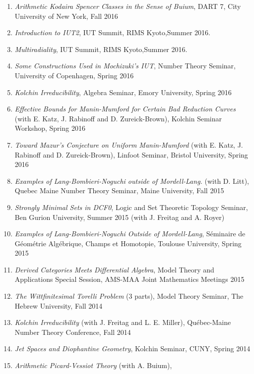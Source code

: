 \documentclass[a4paper,10pt]{article}
\begin{document}
\begin{enumerate}
	\item \emph{Arithmetic Kodaira Spencer Classes in the Sense of Buium}, DART 7, City University of New York, Fall 2016 
	\item \emph{Introduction to IUT2}, IUT Summit, RIMS Kyoto,Summer 2016.
	\item \emph{Multiradiality},  IUT Summit, RIMS Kyoto,Summer 2016. 
	\item \emph{Some Constructions Used in Mochizuki's IUT},  Number Theory Seminar, University of Copenhagen,  Spring 2016
	\item \emph{Kolchin Irreducibility}, Algebra Seminar, Emory University, Spring 2016 
	\item \emph{Effective Bounds for Manin-Mumford for Certain Bad Reduction Curves} (with E. Katz, J. Rabinoff and D. Zureick-Brown), Kolchin Seminar Workshop, Spring 2016
	\item \emph{Toward Mazur's Conjecture on Uniform Manin-Mumford} (with E. Katz, J. Rabinoff and D. Zureick-Brown), Linfoot Seminar, Bristol University, Spring 2016
	\item \emph{Examples of Lang-Bombieri-Noguchi outside of Mordell-Lang.} (with D. Litt),  Quebec Maine Number Theory Seminar, Maine University, Fall 2015
	\item \emph{Strongly Minimal Sets in DCF0},  Logic and Set Theoretic Topology Seminar, Ben Gurion University, Summer 2015 (with J. Freitag and A. Royer)
	\item \emph{Examples of Lang-Bombieri-Noguchi Outside of Mordell-Lang}, S\'eminaire de G\'eom\'etrie Alg\'ebrique, Champs et Homotopie, Toulouse University, Spring 2015
	\item \emph{Derived Categories Meets Differential Algebra}, Model Theory and Applications Special Session, AMS-MAA Joint Mathematics Meetings 2015
	\item \emph{The Wittfinitesimal Torelli Problem} (3 parts), Model Theory Seminar, The Hebrew University, Fall 2014
	\item \emph{Kolchin Irreducibility} (with J. Freitag and L. E. Miller),
	Qu\'{e}bec-Maine Number Theory Conference, Fall 2014
	\item \emph{Jet Spaces and Diophantine Geometry},
	Kolchin Seminar, CUNY, Spring 2014
	\item \emph{Arithmetic Picard-Vessiot Theory} (with A. Buium),

\end{enumerate}
\end{document}
